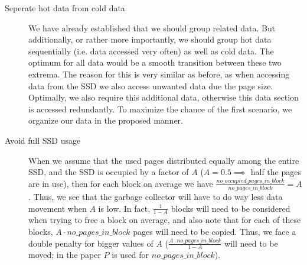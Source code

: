 \documentclass[../../main.tex]{subfiles}
\begin{document}
\begin{description}
    \item[Seperate hot data from cold data] We have already established that we should group related data. But additionally, or rather more importantly, we should group hot data sequentially (i.e. data accessed very often) as well as cold data. The optimum for all data would be a smooth transition between these two extrema. The reason for this is very similar as before, as when accessing data from the SSD we also access unwanted data due the page size. Optimally, we also require this additional data, otherwise this data section is accessed redundantly. To maximize the chance of the first scenario, we organize our data in the proposed manner.
    \item[Avoid full SSD usage] When we assume that the used pages distributed equally among the entire SSD, and the SSD is occupied by a factor of $A$ ($A = 0.5 \implies$ half the pages are in use), then for each block on average we have $\frac{no\_occupied\_pages\_in\_block}{no\_pages\_in\_block} = A$. Thus, we see that the garbage collector will have to do way less data movement when $A$ is low. In fact, $\frac{1}{1-A}$ blocks will need to be considered when trying to free a block on average, and also note that for each of these blocks, $A \cdot no\_pages\_in\_block$ pages will need to be copied. Thus, we face a double penalty for bigger values of $A$ ($\frac{A \cdot no\_pages\_in\_block}{1-A}$ will need to be moved; in the paper $P$ is used for $no\_pages\_in\_block$).
\end{description}
\end{document}
